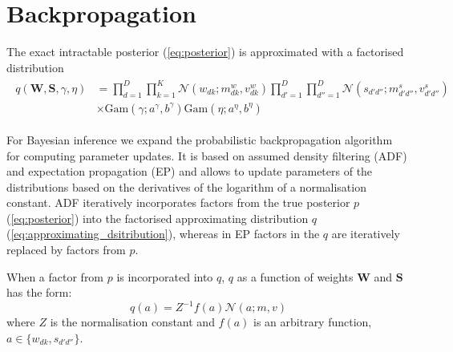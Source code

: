 \documentclass{article}
\begin{document}

%


\section{Backpropagation}
\label{sec:backpropagation}

The exact intractable posterior (\ref{eq:posterior}) is approximated with a factorised distribution
\begin{align}
\label{eq:approximating_dsitribution}
\begin{split}
q(\mathbf{W}, \mathbf{S}, \gamma, \eta) &= \prod_{d=1}^D\prod_{k=1}^K \mathcal{N}(w_{dk} ; m^w_{dk}, v^w_{dk}) \prod_{d'=1}^D\prod_{d''=1}^D \mathcal{N}(s_{d'd''} ; m^s_{d'd''}, v^s_{d'd''}) \\
&\times \text{Gam}(\gamma; a^\gamma, b^\gamma) \text{Gam}(\eta; a^\eta, b^\eta)
\end{split}
\end{align}

For Bayesian inference we expand the probabilistic backpropagation algorithm~\citep{hernandez2015probabilistic} for computing parameter updates. It is based on assumed density filtering (ADF) and expectation propagation (EP) and allows to update parameters of the distributions based on the derivatives of the logarithm of a normalisation constant. ADF iteratively incorporates factors from the true posterior $p$ (\ref{eq:posterior}) into the factorised approximating distribution $q$ (\ref{eq:approximating_dsitribution}), whereas in EP factors in the $q$ are iteratively replaced by factors from $p$.

When a factor from $p$ is incorporated into $q$, $q$ as a function of weights $\mathbf{W}$ and $\mathbf{S}$ has the form:
\begin{equation}
q(a) = Z^{-1}f(a)\mathcal{N}(a; m, v)
\end{equation}
where $Z$ is the normalisation constant and $f(a)$ is an arbitrary function, $a \in \{w_{dk}, s_{d'd''}\}$.
\end{document}
